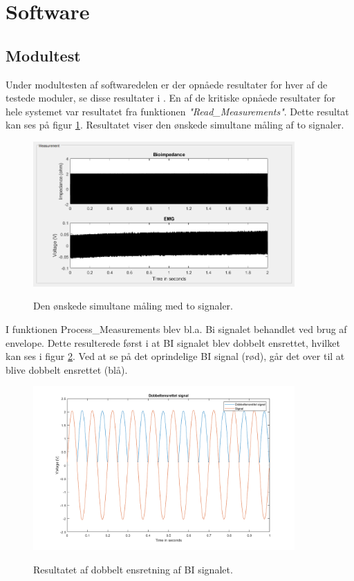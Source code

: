 \section{Software}
\subsection{Modultest}

Under modultesten af softwaredelen er der opnåede resultater for hver af de testede moduler, se disse resultater i . En af de kritiske opnåede resultater for hele systemet var resultatet fra funktionen \textit{"Read\_Measurements"}. Dette resultat kan ses på figur \ref{fig:modultestshow}. Resultatet viser den ønskede simultane måling af to signaler. 

\begin{figure}[H] 
\centering
{\includegraphics[width=10cm]
{Figure/modultestshow}}
\caption{Den ønskede simultane måling med to signaler.}
\label{fig:modultestshow}
\end{figure}


I funktionen Process\_Measurements blev bl.a. Bi signalet behandlet ved brug af envelope. Dette resulterede først i at BI signalet blev dobbelt ensrettet, hvilket kan ses i figur \ref{fig:modultestprocessEnsrettet}. Ved at se på det oprindelige BI signal (rød), går det over til at blive dobbelt ensrettet (blå). 

\begin{figure}[H] 
\centering
{\includegraphics[width=10cm]
{Figure/modultestprocessEnsrettet}}
\caption{Resultatet af dobbelt ensretning af BI signalet.}
\label{fig:modultestprocessEnsrettet}
\end{figure}

